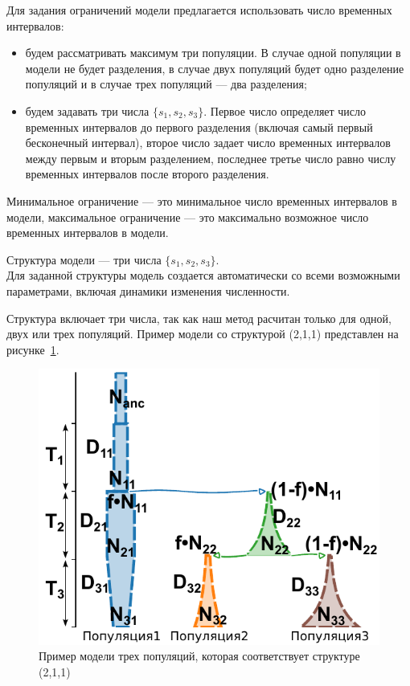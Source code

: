 \documentclass[a4paper,14pt,oneside,openany,article]{memoir}
\begin{document}
Для задания ограничений модели предлагается использовать число временных интервалов:
\begin{itemize}
    \item будем рассматривать максимум три популяции. В случае одной популяции в модели не будет разделения, в случае двух популяций будет одно разделение популяций и в случае трех популяций --- два разделения;
    \item будем задавать три числа $\{s_1, s_2, s_3\}$. Первое число определяет число временных интервалов до первого разделения (включая самый первый бесконечный интервал), второе число задает число временных интервалов между первым и вторым разделением, последнее третье число равно числу временных интервалов после второго разделения.
\end{itemize}
Минимальное ограничение --- это минимальное число временных интервалов в модели, максимальное ограничение --- это максимально возможное число временных интервалов в модели.

 Структура модели --- три числа $\{s_1, s_2, s_3\}$.\\

Для заданной структуры модель создается автоматически со всеми возможными параметрами, включая динамики изменения численности.

Структура включает три числа, так как наш метод расчитан только для одной, двух или трех популяций. Пример модели со структурой (2,1,1) представлен на рисунке~\ref{fig:auto:struct_2_1_1}.
\begin{figure}[h]
    \centering
    \includegraphics[width=0.6\linewidth]{images_2/struct_2_1_1.pdf}
    \caption{Пример модели трех популяций, которая соответствует структуре (2,1,1)}
    \label{fig:auto:struct_2_1_1}
\end{figure}
\end{document}
